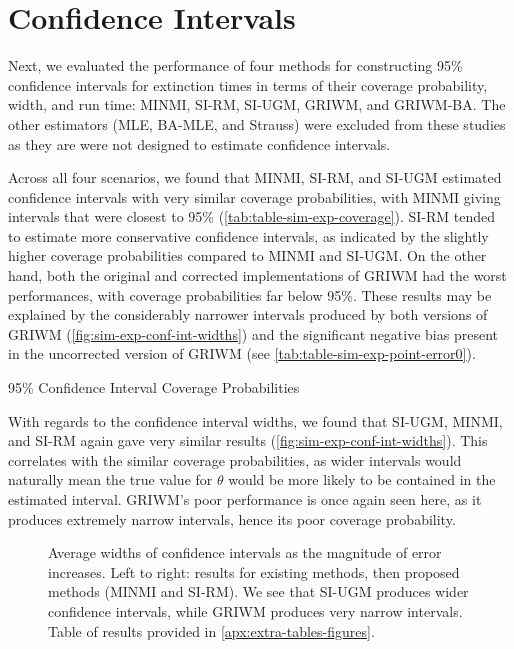 \section{Confidence Intervals}

Next, we evaluated the performance of four methods for constructing 95\% confidence intervals for extinction times in terms of their coverage probability, width, and run time: MINMI, SI-RM, SI-UGM, GRIWM, and GRIWM-BA. The other estimators (MLE, BA-MLE, and Strauss) were excluded from these studies as they are were not designed to estimate confidence intervals.

Across all four scenarios, we found that MINMI, SI-RM, and SI-UGM estimated confidence intervals with very similar coverage probabilities, with MINMI giving intervals that were closest to 95\% (\autoref{tab:table-sim-exp-coverage}). SI-RM tended to estimate more conservative confidence intervals, as indicated by the slightly higher coverage probabilities compared to MINMI and SI-UGM. On the other hand, both the original and corrected implementations of GRIWM had the worst performances, with coverage probabilities far below 95\%. These results may be explained by the considerably narrower intervals produced by both versions of GRIWM (\autoref{fig:sim-exp-conf-int-widths}) and the significant negative bias present in the uncorrected version of GRIWM (see \autoref{tab:table-sim-exp-point-error0}).
\begin{table}[ht]
    \centering
    \caption{95\% Confidence Interval Coverage Probabilities}
    
    \label{tab:table-sim-exp-coverage}
    \vspace{-4mm}
\end{table}

With regards to the confidence interval widths, we found that SI-UGM, MINMI, and SI-RM again gave very similar results (\autoref{fig:sim-exp-conf-int-widths}). This correlates with the similar coverage probabilities, as wider intervals would naturally mean the true value for $\theta$ would be more likely to be contained in the  estimated interval. GRIWM's poor performance is once again seen here, as it produces extremely narrow intervals, hence its poor coverage probability.
\begin{figure}[ht]
    \centering
    
    \caption{Average widths of confidence intervals as the magnitude of error increases. Left to right: results for existing methods, then proposed methods (MINMI and SI-RM). We see that SI-UGM produces wider confidence intervals, while GRIWM produces very narrow intervals. Table of results provided in \autoref{apx:extra-tables-figures}.}
    \label{fig:sim-exp-conf-int-widths}
\end{figure}

